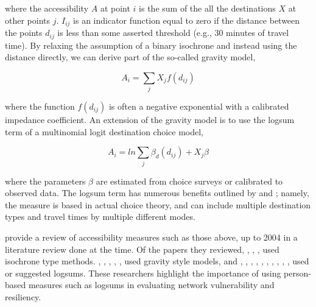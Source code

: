 \noindent where the accessibility \(A\) at point \(i\) is the sum of the all the
destinations \(X\) at other points \(j\). \(I_{ij}\) is an indicator
function equal to
zero if the distance between the points $d_{ij}$ is less than some asserted
threshold (e.g., 30 minutes of travel time). By relaxing the
assumption of a
binary isochrone and instead using the distance directly, we can derive part of the
so-called gravity model,

\begin{equation}
A_i = \sum_{j} X_j f(d_{ij})
  \label{eqn::gravity}
\end{equation}

\noindent where the function $f(d_{ij})$ is often a negative exponential with a
calibrated
impedance coefficient. An extension of the gravity model is to use the
logsum
term of a multinomial logit destination choice model,

\begin{equation}
A_i = ln\sum_{j} \beta_d(d_{ij}) + X_j\beta
  \label{eqn:logsum1}
\end{equation}

\noindent where the parameters $\beta$ are estimated from choice surveys or
calibrated to
observed data. The logsum term has numerous benefits outlined by
\citet{handy1997}
and \citet{geurs2004}; namely, the measure is based in actual choice
theory, and
can include multiple destination types and travel times by multiple
different modes.

\citet{geurs2004} provide a review of accessibility measures such as those
above, up to
2004 in a literature review done at the time. Of the papers they reviewed, \citet{vickerman1974}, \citet{ben1979}, \citet{geurs2001}, used isochrone type methods. \citet{stewart1947}, \citet{hansen1959}, \citet{ingram1971}, \citet{vickerman1974}, \citet{anas1983}, used gravity
style models, and \citet{neuburger1971}, \citet{leonardi1978}, \citet{williams1978}, \citet{koenig1980indicators}, \citet{anas1983}, \citet{ben1985discrete}, \citet{sweet1997aggregate}, \citet{niemeier1997accessibility}, \citet{handy1997}, \citet{levine1998rethinking}, \citet{miller1999measuring} used or
suggested logsums. These researchers highlight the importance of using person-based
measures such as logsums in
evaluating network vulnerability and resiliency.

